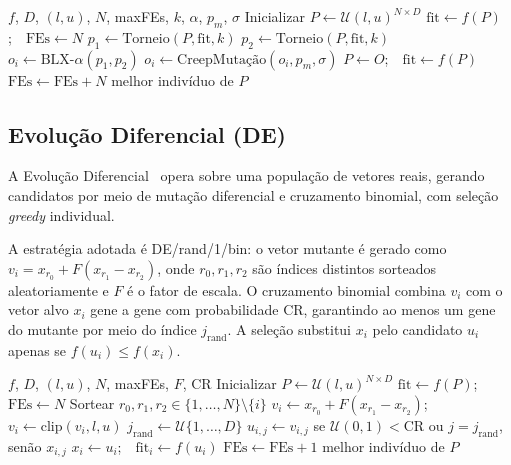 \documentclass[runningheads]{llncs}
\begin{document}
\begin{algorithm}[ht]
\caption{Algoritmo Genético (AG)}
\label{alg:ag}
\begin{algorithmic}[1]
\Require $f$, $D$, $(l,u)$, $N$, maxFEs, $k$, $\alpha$, $p_m$, $\sigma$
\State Inicializar $P \leftarrow \mathcal{U}(l,u)^{N \times D}$
\State $\text{fit} \leftarrow f(P)$;\ \ $\text{FEs} \leftarrow N$
    \State $p_1 \leftarrow \text{Torneio}(P, \text{fit}, k)$
    \State $p_2 \leftarrow \text{Torneio}(P, \text{fit}, k)$
    \State $o_i \leftarrow \text{BLX-}\alpha(p_1, p_2)$
    \State $o_i \leftarrow \text{CreepMutação}(o_i, p_m, \sigma)$
  \EndFor
  \State $P \leftarrow O$;\ \ $\text{fit} \leftarrow f(P)$
  \State $\text{FEs} \leftarrow \text{FEs} + N$
\EndWhile
\State \Return melhor indivíduo de $P$
\end{algorithmic}
\end{algorithm}

\subsection{Evolução Diferencial (DE)}

A Evolução Diferencial~\cite{storn1997} opera sobre uma população de
vetores reais, gerando candidatos por meio de mutação diferencial e
cruzamento binomial, com seleção \emph{greedy} individual.

A estratégia adotada é DE/rand/1/bin: o vetor mutante é gerado como
$v_i = x_{r_0} + F(x_{r_1} - x_{r_2})$, onde $r_0, r_1, r_2$ são
índices distintos sorteados aleatoriamente e $F$ é o fator de escala.
O cruzamento binomial combina $v_i$ com o vetor alvo $x_i$ gene a
gene com probabilidade CR, garantindo ao menos um gene do mutante por
meio do índice $j_{\text{rand}}$. A seleção substitui $x_i$ pelo
candidato $u_i$ apenas se $f(u_i) \leq f(x_i)$.

\begin{algorithm}[ht]
\caption{Evolução Diferencial (DE/rand/1/bin)}
\label{alg:de}
\begin{algorithmic}[1]
\Require $f$, $D$, $(l,u)$, $N$, maxFEs, $F$, CR
\State Inicializar $P \leftarrow \mathcal{U}(l,u)^{N \times D}$
\State $\text{fit} \leftarrow f(P)$;\ \ $\text{FEs} \leftarrow N$
    \State Sortear $r_0, r_1, r_2 \in \{1,\ldots,N\} \setminus \{i\}$
    \State $v_i \leftarrow x_{r_0} + F(x_{r_1} - x_{r_2})$;\ \
           $v_i \leftarrow \text{clip}(v_i, l, u)$
    \State $j_{\text{rand}} \leftarrow \mathcal{U}\{1,\ldots,D\}$
    \For{$j = 1$ \textbf{to} $D$}
      \State $u_{i,j} \leftarrow v_{i,j}$ se $\mathcal{U}(0,1) < \text{CR}$
             ou $j = j_{\text{rand}}$, senão $x_{i,j}$
    \EndFor
      \State $x_i \leftarrow u_i$;\ \ $\text{fit}_i \leftarrow f(u_i)$
    \EndIf
    \State $\text{FEs} \leftarrow \text{FEs} + 1$
  \EndFor
\EndWhile
\State \Return melhor indivíduo de $P$
\end{algorithmic}
\end{algorithm}
\end{document}
